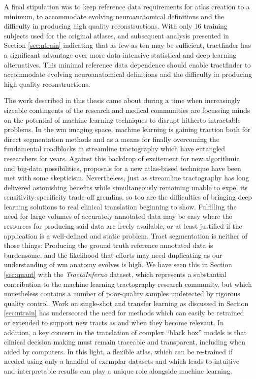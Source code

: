 \documentclass[12pt,phd,a4paper,twoside]{ucl_thesis}
\providecommand{\DIFaddtex}[1]{{\protect\color{blue} \sf #1}} %
\providecommand{\DIFdeltex}[1]{{\protect\color{red} \scriptsize #1}} %
\providecommand{\DIFaddbegin}{} %
\providecommand{\DIFaddend}{} %
\providecommand{\DIFdelbegin}{} %
\providecommand{\DIFdelend}{} %
\providecommand{\DIFadd}[1]{\texorpdfstring{\DIFaddtex{#1}}{#1}} %
\providecommand{\DIFdel}[1]{\texorpdfstring{\DIFdeltex{#1}}{}} %
\newcommand{\DIFscaledelfig}{0.5}
\newlength{\DIFdelgraphicswidth} %
\newlength{\DIFdelgraphicsheight} %
\newcommand{\DIFaddincludegraphics}[2][]{{\color{blue}\fbox{\DIFOincludegraphics[#1]{#2}}}} %
\newcommand{\DIFdelincludegraphics}[2][]{%
\sbox{\DIFdelgraphicsbox}{\DIFOincludegraphics[#1]{#2}}%
\settoboxwidth{\DIFdelgraphicswidth}{\DIFdelgraphicsbox} %
\settoboxtotalheight{\DIFdelgraphicsheight}{\DIFdelgraphicsbox} %
\scalebox{\DIFscaledelfig}{%
\parbox[b]{\DIFdelgraphicswidth}{\usebox{\DIFdelgraphicsbox}\\[-\baselineskip] \rule{\DIFdelgraphicswidth}{0em}}\llap{\resizebox{\DIFdelgraphicswidth}{\DIFdelgraphicsheight}{%
\setlength{\unitlength}{\DIFdelgraphicswidth}%
\begin{picture}(1,1)%
\thicklines\linethickness{2pt} %
{\color[rgb]{1,0,0}\put(0,0){\framebox(1,1){}}}%
{\color[rgb]{1,0,0}\put(0,0){\line( 1,1){1}}}%
{\color[rgb]{1,0,0}\put(0,1){\line(1,-1){1}}}%
\end{picture}%
}\hspace*{3pt}}} %
} %
\DeclareRobustCommand{\DIFaddbegin}{\DIFOaddbegin \let\includegraphics\DIFaddincludegraphics} %
\DeclareRobustCommand{\DIFaddend}{\DIFOaddend \let\includegraphics\DIFOincludegraphics} %
\DeclareRobustCommand{\DIFdelbegin}{\DIFOdelbegin \let\includegraphics\DIFdelincludegraphics} %
\DeclareRobustCommand{\DIFdelend}{\DIFOaddend \let\includegraphics\DIFOincludegraphics} %
\begin{document}
\begin{itemize}
\DIFdelbegin \DIFdel{A final stipulation was to keep reference data requirements for atlas creation to a minimum, to accommodate evolving neuroanatomical definitions and the difficulty in producing high quality reconstructions.
}\DIFdelend With only 16 training subjects used for the original atlases, and subsequent analysis presented in Section \ref{sec:ntrain} indicating that as few as ten may be sufficient, tractfinder has a significant advantage over more data-intensive statistical and deep learning alternatives.
\DIFaddbegin \DIFadd{This minimal reference data dependence should enable tractfinder to accommodate evolving neuroanatomical definitions and the difficulty in producing high quality reconstructions.
}\DIFaddend 

The work described in this thesis came about during a time when increasingly sizeable contingents of the research and medical communities are focussing minds on the potential of machine learning techniques to disrupt hitherto intractable problems.
In the \gls{wm} imaging space, machine learning is gaining traction both for direct segmentation methods and as a means for finally overcoming the fundamental roadblocks in streamline tractography which have entangled researchers for years.
Against this backdrop of excitement for new algorithmic and big-data possibilities, proposals for a new atlas-based technique have been met with some skepticism.
Nevertheless, just as streamline tractography has long delivered astonishing benefits while simultaneously remaining unable to expel its sensitivity-specificity trade-off gremlins, so too are the difficulties of bringing deep learning solutions to real clinical translation beginning to show.
Fulfilling the need for large volumes of accurately annotated data may be easy where the resources for producing said data are freely available, or at least justified if the application is a well-defined and static problem.
Tract segmentation is neither of those things:
Producing the ground truth reference annotated data is burdensome, and the likelihood that efforts may need duplicating as our understanding of \gls{wm} anatomy evolves is high.
We have seen this in Section \ref{sec:quant} with the \textit{TractoInferno} dataset, which represents a substantial contribution to the machine learning tractography research community, but which nonetheless contains a number of poor-quality samples undetected by rigorous quality control.
Work on single-shot and transfer learning as discussed in Section \ref{sec:ntrain} has underscored the need for methods which can easily be retrained or extended to support new tracts as and when they become relevant.
In addition, a key concern in the translation of complex ``black box'' models is that clinical decision making must remain traceable and transparent, including when aided by computers.
In this light, a flexible atlas, which can be re-trained if needed using only a handful of exemplar datasets and which leads to intuitive and interpretable results can play a unique role alongside machine learning.

\DIFaddbegin \end{itemize}
\end{document}
